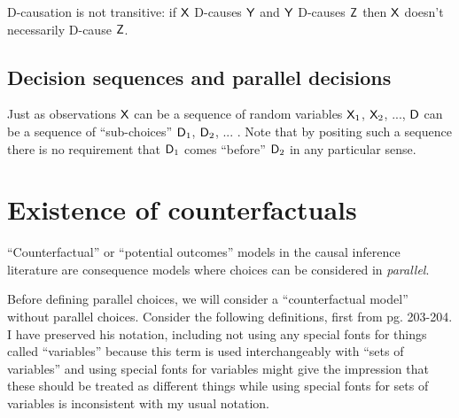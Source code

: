 D-causation is not transitive: if $\mathsf{X}$ D-causes $\mathsf{Y}$ and $\mathsf{Y}$ D-causes $\mathsf{Z}$ then $\mathsf{X}$ doesn't necessarily D-cause $\mathsf{Z}$.



\subsection{Decision sequences and parallel decisions}

Just as observations $\mathsf{X}$ can be a sequence of random variables $\mathsf{X}_1$, $\mathsf{X}_2$, ..., $\mathsf{D}$ can be a sequence of ``sub-choices'' $\mathsf{D}_1$, $\mathsf{D}_2$, ... . Note that by positing such a sequence there is no requirement that $\mathsf{D}_1$ comes ``before'' $\mathsf{D}_2$ in any particular sense.




\section{Existence of counterfactuals}


``Counterfactual'' or ``potential outcomes'' models in the causal inference literature are consequence models where choices can be considered in \emph{parallel}. 

Before defining parallel choices, we will consider a ``counterfactual model'' without parallel choices. Consider the following definitions, first from \citet{pearl_causality:_2009} pg. 203-204. I have preserved his notation, including not using any special fonts for things called ``variables'' because this term is used interchangeably with ``sets of variables'' and using special fonts for variables might give the impression that these should be treated as different things while using special fonts for sets of variables is inconsistent with my usual notation.


